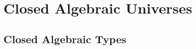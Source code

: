 \documentclass[12pt]{report}
\theoremstyle{definition}
\theoremstyle{remark}
\numberwithin{definition}{section}
\numberwithin{equation}{section}
\numberwithin{proposition}{section}
\numberwithin{conjecture}{section}
\numberwithin{theorem}{section}
\numberwithin{lemma}{section}
\numberwithin{corollary}{section}
\numberwithin{example}{section}
\numberwithin{remark}{section}
\begin{document}



\part{Closed Algebraic Universes}\label{part:closed}




\chapter{Closed Algebraic Types}\label{ch:closed}
\end{document}
